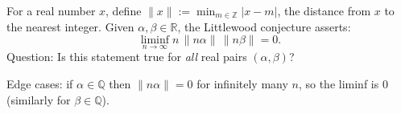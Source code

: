 For a real number $x$, define $\|x\|:=\min_{m\in\mathbb{Z}}|x-m|$, the distance from $x$ to the nearest integer.
Given $\alpha,\beta\in\mathbb{R}$, the Littlewood conjecture asserts:
\[
\liminf_{n\to\infty} n\,\|n\alpha\|\,\|n\beta\| = 0.
\]
Question: Is this statement true for \emph{all} real pairs $(\alpha,\beta)$?

Edge cases: if $\alpha\in\mathbb{Q}$ then $\|n\alpha\|=0$ for infinitely many $n$, so the liminf is $0$ (similarly for $\beta\in\mathbb{Q}$).
